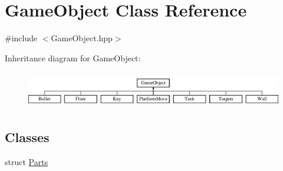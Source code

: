 \hypertarget{class_game_object}{}\section{Game\+Object Class Reference}
\label{class_game_object}


{\ttfamily \#include $<$Game\+Object.\+hpp$>$}

Inheritance diagram for Game\+Object\+:\begin{figure}[H]
\begin{center}
\leavevmode
\includegraphics[height=1.632653cm]{class_game_object}
\end{center}
\end{figure}
\subsection*{Classes}
\begin{DoxyCompactItemize}
\item 
struct \mbox{\hyperlink{struct_game_object_1_1_parts}{Parts}}
\end{DoxyCompactItemize}
